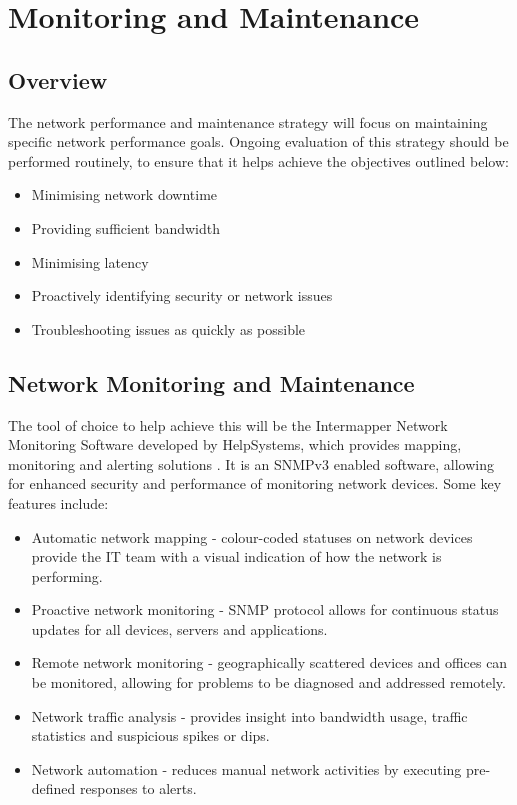 \chapter{Monitoring and Maintenance}

\section{Overview}
The network performance and maintenance strategy will focus on maintaining specific network performance goals. Ongoing evaluation of this strategy should be performed routinely, to ensure that it helps achieve the objectives outlined below:
\begin{itemize}
    \item Minimising network downtime
    \item Providing sufficient bandwidth
    \item Minimising latency
    \item Proactively identifying security or network issues
    \item Troubleshooting issues as quickly as possible
\end{itemize}

\section{Network Monitoring and Maintenance}
The tool of choice to help achieve this will be the Intermapper Network Monitoring Software developed by HelpSystems, which provides mapping, monitoring and alerting solutions \parencite{helpsystems}. It is an SNMPv3 enabled software, allowing for enhanced security and performance of monitoring network devices. Some key features include:
\begin{itemize}
    \item Automatic network mapping - colour-coded statuses on network devices provide the IT team with a visual indication of how the network is performing.
    \item Proactive network monitoring - SNMP protocol allows for continuous status updates for all devices, servers and applications.
    \item Remote network monitoring - geographically scattered devices and offices can be monitored, allowing for problems to be diagnosed and addressed remotely.
    \item Network traffic analysis - provides insight into bandwidth usage, traffic statistics and suspicious spikes or dips.
    \item Network automation - reduces manual network activities by executing pre-defined responses to alerts.
\end{itemize}

